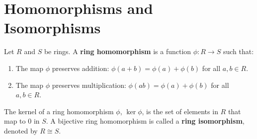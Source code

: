 \documentclass[12pt, oneside]{book}
\begin{document}
\section{Homomorphisms and Isomorphisms}
Let \(R\) and \(S\) be rings.
A \textbf{ring homomorphism} is a function \(\phi: R \to S\) such that:
\begin{enumerate}
    \item The map \(\phi\) preserves addition: \(\phi(a + b) = \phi(a) + \phi(b)\) for all \(a, b \in R\).
    \item The map \(\phi\) preserves multiplication: \(\phi(ab) = \phi(a) + \phi(b)\) for all \(a, b \in R\).
\end{enumerate}
The kernel of a ring homomorphism \(\phi\), \(\ker \phi\), is the set of elements in \(R\) that map to \(0\) in \(S\).
A bijective ring homomorphism is called a \textbf{ring isomorphism}, denoted by \(R \cong S\).
\end{document}
